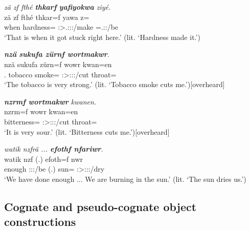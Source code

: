 \begin{exe}
	\ex \emph{zä zf fthé \textbf{thkarf} \textbf{yafiyokwa} ziyé.}\\
	\gll zä zf fthé thkar=f yawa z=\\
	{\Prox} {\Imm} when hardness={\Erg} \Stsg:\Sbj>\Tsg.\Masc:\Obj:\Pst:\Ipfv/make {\Prox}=\Tsg.\Masc:\Nonpast:\Ipfv/be\\
	\trans `That is when it got stuck right here.' (lit. `Hardness made it.')\\
	\label{ex584}
\end{exe}
\begin{exe}
	\ex \emph{\textbf{nzä} \textbf{sukufa zürnf wortmakwr}.}\\
	\gll nzä sukufa zürn=f wowr kwan=en\\
	\Fsg.{\Abs} tobacco smoke={\Erg} \Stsg:\Sbj>\Fsg:\Obj:\Nonpast:\Ipfv/cut throat={\Loc}\\
	\trans `The tobacco is very strong.' (lit. `Tobacco smoke cuts me.'){\hspace*{1pt}\hfill{\footnotesize{[overheard]}}}
	\label{ex585}
\end{exe}
\begin{exe}
	\ex \emph{\textbf{nzrmf wortmakwr} kwanen.}\\
	\gll nzrm=f wowr kwan=en\\
	bitterness={\Erg} \Stsg:\Sbj>\Fsg:\Obj:\Nonpast:\Ipfv/cut throat={\Loc}\\
	\trans `It is very sour.' (lit. `Bitterness cuts me.'){\hspace*{1pt}\hfill{\footnotesize{[overheard]}}}
	\label{ex586}
\end{exe}
\begin{exe}
	\ex \emph{watik nzfrä ... \textbf{efothf nfariwr}.}\\
	\gll watik nzf (.) efoth=f nwr\\
	enough \Fpl:\Sbj:\Rpst:\Ipfv/be (.) sun={\Erg} \Stsg:\Sbj>\Fpl:\Obj:\Nonpast:\Ipfv/dry\\
	\trans `We have done enough ... We are burning in the sun.' (lit. `The sun dries us.')
	\label{ex587}
\end{exe}

\subsection{Cognate and pseudo-cognate object constructions}\label{pseudocognate}

